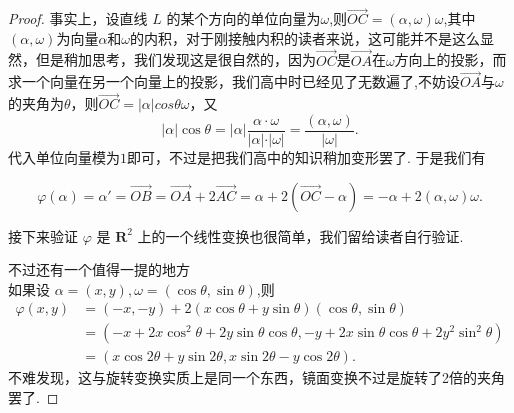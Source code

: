\begin{proof}
    事实上，设直线 $L$ 的某个方向的单位向量为$\omega$,则$\vec{OC}=(\alpha,\omega)\omega$,其中$(\alpha,\omega)$为向量$\alpha$和$\omega$的内积，对于刚接触内积的读者来说，这可能并不是这么显然，但是稍加思考，我们发现这是很自然的，因为$\vec{OC}$是$\vec{OA}$在$\omega$方向上的投影，而求一个向量在另一个向量上的投影，我们高中时已经见了无数遍了,不妨设$\vec{OA}$与$\omega$的夹角为$\theta$，则$\vec{OC}=\vert\alpha \vert cos\theta\omega$，又
    \[
        \vert\alpha \vert\cos\theta=\vert\alpha \vert\dfrac{\alpha\cdot\omega}{\vert \alpha\vert\cdot\vert\omega\vert}=\dfrac{(\alpha,\omega)}{\vert\omega\vert}.
    \]
    代入单位向量模为$1$即可，不过是把我们高中的知识稍加变形罢了. 于是我们有

    \[
    \varphi(\alpha)=\alpha'=\vec{OB}=\vec{OA}+2\vec{AC}= \alpha + 2(\vec{OC}-\alpha)=-\alpha+2(\alpha,\omega)\omega.
    \]

    接下来验证 $\varphi$ 是 $\mathbf{R}^2$ 上的一个线性变换也很简单，我们留给读者自行验证.

    不过还有一个值得一提的地方\\
    如果设 $\alpha = (x,y),\omega =(\cos \theta,\sin \theta)$,则
    \begin{align*}
        \varphi(x,y)&=(-x,-y)+2(x\cos\theta+y\sin\theta)(\cos \theta,\sin \theta)\\
        &=(-x + 2x \cos^2 \theta + 2y \sin \theta \cos \theta, -y + 2x \sin \theta \cos \theta + 2y^2 \sin^2 \theta)\\
        &=(x \cos 2\theta + y \sin 2\theta, x \sin 2\theta - y \cos 2\theta).
    \end{align*}
    不难发现，这与旋转变换实质上是同一个东西，镜面变换不过是旋转了2倍的夹角罢了.
\end{proof}

\begin{summary}

\end{summary}

